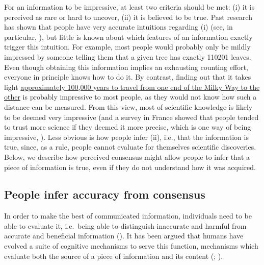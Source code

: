 \documentclass[
  jou,
  floatsintext,
  longtable,
  nolmodern,
  notxfonts,
  notimes,
  colorlinks=true,linkcolor=blue,citecolor=blue,urlcolor=blue]{apa7}
\begin{document}
For an information to be impressive, at least two criteria should be
met: (i) it is perceived as rare or hard to uncover, (ii) it is believed
to be true. Past research has shown that people have very accurate
intuitions regarding (i) (see, in particular,
), but
little is known about which features of an information exactly trigger
this intuition. For example, most people would probably only be mildly
impressed by someone telling them that a given tree has exactly 110201
leaves. Even though obtaining this information implies an exhausting
counting effort, everyone in principle knows how to do it. By contrast,
finding out that it takes light
\href{https://imagine.gsfc.nasa.gov/features/cosmic/milkyway_info.html}{approximately
100,000 years to travel from one end of the Milky Way to the other} is
probably impressive to most people, as they would not know how such a
distance can be measured. From this view, most of scientific knowledge
is likely to be deemed very impressive (and a survey in France showed
that people tended to trust more science if they deemed it more precise,
which is one way of being impressive,
).
Less obvious is how people infer (ii), i.e., that the information is
true, since, as a rule, people cannot evaluate for themselves scientific
discoveries. Below, we describe how perceived consensus might allow
people to infer that a piece of information is true, even if they do not
understand how it was acquired.

\subsection{People infer accuracy from
consensus}\label{people-infer-accuracy-from-consensus}

In order to make the best of communicated information, individuals need
to be able to evaluate it, i.e.~being able to distinguish inaccurate and
harmful from accurate and beneficial information
(). It has been argued that humans have evolved a suite of cognitive
mechanisms to serve this function, mechanisms which evaluate both the
source of a piece of information and its content
(;
).
\end{document}

